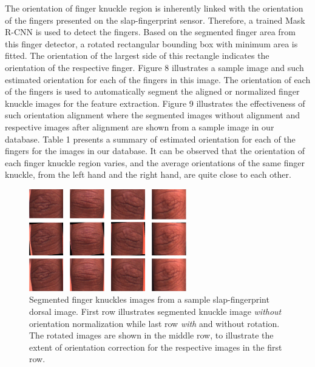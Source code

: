 The orientation of finger knuckle region is inherently linked with the orientation of the fingers presented on the slap-fingerprint sensor. Therefore, a trained Mask R-CNN is used to detect the fingers. Based on the segmented finger area from this finger detector, a rotated rectangular bounding box with minimum area is fitted. The orientation of the largest side of this rectangle indicates the orientation of the respective finger. Figure 8 illustrates a sample image and such estimated orientation for each of the fingers in this image. The orientation of each of the fingers is used to automatically segment the aligned or normalized finger knuckle images for the feature extraction. Figure 9 illustrates the effectiveness of such orientation alignment where the segmented images without alignment and respective images after alignment are shown from a sample image in our database. Table 1 presents a summary of estimated orientation for each of the fingers for the images in our database. It can be observed that the orientation of each finger knuckle region varies, and the average orientations of the same finger knuckle, from the left hand and the right hand, are quite close to each other.

\begin{figure}
    \centering
    \includegraphics[width=2.7in]{Figures/orientation-normization.png}
    \caption{Segmented finger knuckles images from a sample slap-fingerprint dorsal image. First row illustrates segmented knuckle image \textit{without} orientation normalization while last row \textit{with} and without rotation. The rotated images are shown in the middle row, to illustrate the extent of orientation correction for the respective images in the first row.}
    \label{orientaion-normlization}
\end{figure}


